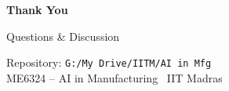 \documentclass[11pt,aspectratio=169]{beamer}
\begin{document}
\begin{frame}
    \centering
    \vfill
    \Huge \textbf{Thank You}
    \vspace{1em}

    \Large Questions \& Discussion
    \vspace{2em}

    \large Repository: \texttt{G:/My Drive/IITM/AI in Mfg} \\
    ME6324 -- AI in Manufacturing \textbar\ IIT Madras
    \vfill
\end{frame}
\end{document}
